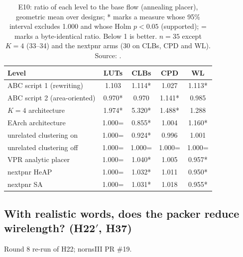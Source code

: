 \begin{table}[t]
\caption{E10: ratio of each level to the base flow (annealing placer), geometric mean over designs; * marks a measure whose 95\% interval excludes 1.000 and whose Holm $p<0.05$ (supported); = marks a byte-identical ratio. Below 1 is better. $n=35$ except $K=4$ (33--34) and the nextpnr arms (30 on CLBs, CPD and WL). Source: .}
\label{tab:e10}
\centering
\footnotesize
\begin{tabular}{@{}lcccc@{}}
\toprule
Level & LUTs & CLBs & CPD & WL \\
\midrule
ABC script 1 (rewriting) & 1.103 & 1.114* & 1.027 & 1.113* \\
ABC script 2 (area-oriented) & 0.970* & 0.970 & 1.141* & 0.985 \\
$K=4$ architecture & 1.974* & 5.320* & 1.488* & 1.288 \\
EArch architecture & 1.000= & 0.855* & 1.004 & 1.160* \\
unrelated clustering on & 1.000= & 0.924* & 0.996 & 1.001 \\
unrelated clustering off & 1.000= & 1.000= & 1.000= & 1.000= \\
VPR analytic placer & 1.000= & 1.040* & 1.005 & 0.957* \\
nextpnr HeAP & 1.000= & 1.032* & 1.011 & 0.950* \\
nextpnr SA & 1.000= & 1.031* & 1.018 & 0.955* \\
\bottomrule
\end{tabular}
\end{table}

\subsection{With realistic words, does the packer reduce wirelength? (H22$'$, H37)}
\label{sec:e-h22p}

 Round 8 re-run of H22; nornsIII PR \#19.

